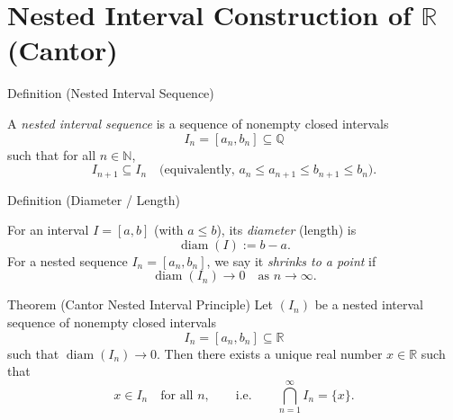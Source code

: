 
\section{\texorpdfstring{Nested Interval Construction of $\mathbb{R}$ (Cantor)}{Nested Interval Construction of R (Cantor)}}
\label{sec:reals-nested-intervals}


\begin{definitionbox}{Definition (Nested Interval Sequence)}
\begin{definition}\label{def:nested-intervals}
A \emph{nested interval sequence} is a sequence of nonempty closed intervals
\[
I_n = [a_n,b_n] \subseteq \mathbb{Q}
\]
such that for all $n\in\mathbb{N}$,
\[
I_{n+1}\subseteq I_n
\quad\text{(equivalently, } a_n \le a_{n+1} \le b_{n+1} \le b_n\text{).}
\]
\end{definition}
\end{definitionbox}

\begin{definitionbox}{Definition (Diameter / Length)}
\begin{definition}\label{def:diameter}
For an interval $I=[a,b]$ (with $a\le b$), its \emph{diameter} (length) is
\[
\operatorname{diam}(I) := b-a.
\]
For a nested sequence $I_n=[a_n,b_n]$, we say it \emph{shrinks to a point} if
\[
\operatorname{diam}(I_n) \longrightarrow 0 \quad \text{as } n\to\infty.
\]
\end{definition}
\end{definitionbox}

\begin{theorembox}{Theorem (Cantor Nested Interval Principle)}
\label{thm:cantor-nested}
Let $(I_n)$ be a nested interval sequence of nonempty closed intervals
\[
I_n=[a_n,b_n] \subseteq \mathbb{R}
\]
such that $\operatorname{diam}(I_n)\to 0$.
Then there exists a unique real number $x\in\mathbb{R}$ such that
\[
x\in I_n \quad\text{for all } n,
\qquad\text{i.e.}\qquad
\bigcap_{n=1}^\infty I_n = \{x\}.
\]
\end{theorembox}

